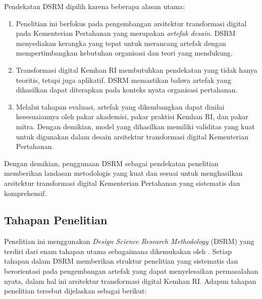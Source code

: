 Pendekatan DSRM dipilih karena beberapa alasan utama:
\begin{enumerate}
  \item Penelitian ini berfokus pada pengembangan arsitektur transformasi digital pada Kementerian Pertahanan yang merupakan \textit{artefak desain}.
  DSRM menyediakan kerangka yang tepat untuk merancang artefak dengan mempertimbangkan kebutuhan organisasi dan teori yang mendukung.
  \item Transformasi digital Kemhan RI membutuhkan pendekatan yang tidak hanya teoritis, tetapi juga aplikatif.
  DSRM memastikan bahwa artefak yang dihasilkan dapat diterapkan pada konteks nyata organisasi pertahanan.
  \item Melalui tahapan evaluasi, artefak yang dikembangkan dapat dinilai kesesuaiannya oleh pakar akademisi, pakar praktisi Kemhan RI, dan pakar mitra.
  Dengan demikian, model yang dihasilkan memiliki validitas yang kuat untuk digunakan dalam desain arsitektur transformasi digital Kementerian Pertahanan.
\end{enumerate}
Dengan demikian, penggunaan DSRM sebagai pendekatan penelitian memberikan landasan metodologis yang kuat dan sesuai untuk menghasilkan arsitektur transformasi digital Kementerian Pertahanan yang sistematis dan komprehensif.

\subsection{Tahapan Penelitian}
Penelitian ini menggunakan \textit{Design Science Research Methodology} (DSRM) yang terdiri dari enam tahapan utama sebagaimana dikemukakan oleh \textcite{Peffers2007}.
Setiap tahapan dalam DSRM memberikan struktur penelitian yang sistematis dan berorientasi pada pengembangan artefak yang dapat menyelesaikan permasalahan nyata, dalam hal ini arsitektur transformasi digital Kemhan RI.
Adapun tahapan penelitian tersebut dijelaskan sebagai berikut:

